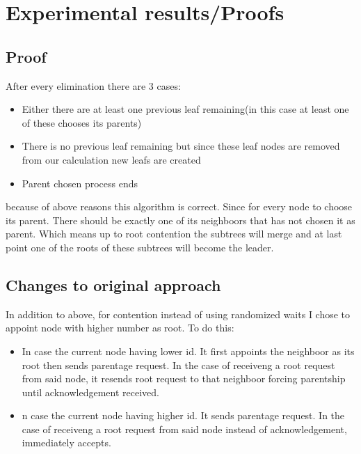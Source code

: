 \documentclass[11pt]{beamer}              %
\begin{document}
\section{Experimental results/Proofs}

\subsection{Proof}
\begin{frame}
	After every elimination there are 3 cases:
	\begin{itemize}
		\item Either there are at least one previous leaf remaining(in this case at least one of these chooses its parents)
		\item There is no previous leaf remaining but since these leaf nodes are removed from our calculation new leafs are created
		\item Parent chosen process ends
	\end{itemize}
because of above reasons this algorithm is correct. Since for every node to choose its parent. There should be exactly one of its neighboors that has not chosen it as parent. Which means up to root contention the subtrees will merge and at last point one of the roots of these subtrees will become the leader.
\end{frame}

\subsection{Changes to original approach}
\begin{frame}
	In addition to above, for contention instead of using randomized waits I chose to appoint node with higher number as root. To do this:
	\begin{itemize}
		\item In case the current node having lower id. It first appoints the neighboor as its root then sends parentage request. In the case of receiveng a root request from said node, it resends root request to that neighboor forcing parentship until acknowledgement received. 
		\item n case the current node having higher id. It sends parentage request. In the case of receiveng a root request from said node instead of acknowledgement, immediately accepts.
	\end{itemize}
\end{frame}
\end{document}
